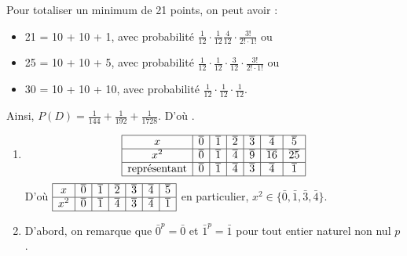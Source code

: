 \begin{description}
\begin{enumerate}
            Pour totaliser un minimum de 21 points, on peut avoir : 
            \begin{itemize}
               \item 21 = 10 + 10 + 1, avec probabilit\'e
                  $\frac{1}{12}\cdot\frac{1}{12}\frac{4}{12}\cdot\frac{3!}{2!\cdot1!}$ ou
               \item 25 = 10 + 10 + 5, avec probabilit\'e 
                  $\frac{1}{12}\cdot\frac{1}{12}\cdot\frac{3}{12}\cdot\frac{3!}{2!\cdot1!}$ ou
               \item 30 = 10 + 10 + 10, avec probabilit\'e 
                  $\frac{1}{12}\cdot\frac{1}{12}\cdot\frac{1}{12}$.
            \end{itemize}
            Ainsi, $P(D) = \frac{1}{144} + \frac{1}{192} + \frac{1}{1728}$.
            D'o\`u .
      \end{enumerate}
   \item[II. \textsc{Arithm\'etique}]
      \begin{enumerate}
         \item {}
            \[
               \begin{array}{|c|c|c|c|c|c|c|}
               \hline 
               x & \bar{0} & \bar{1} & \bar{2} & \bar{3} & \bar{4} & \bar{5} \\ 
               \hline 
               x^2 & \bar{0} & \bar{1} & \bar{4} & \bar{9} & \bar{16} & \bar{25} \\ 
               \hline 
               \text{repr\'esentant} & \bar{0} & \bar{1} & \bar{4} & \bar{3} & \bar{4} & \bar{1} \\ 
               \hline 
               \end{array} 
            \]
            D'o\`u 
            $\displaystyle{
               \begin{array}{|c|c|c|c|c|c|c|}
               \hline 
               x & \bar{0} & \bar{1} & \bar{2} & \bar{3} & \bar{4} & \bar{5} \\ 
               \hline 
               x^2 & \bar{0} & \bar{1} & \bar{4} & \bar{3} & \bar{4} & \bar{1} \\ 
               \hline 
               \end{array} 
            }$
            en particulier, $x^2 \in \{ \bar{0} , \bar{1} , \bar{3} , \bar{4} \}$.
         \item {}
            D'abord, on remarque que $\bar{0}^p = \bar{0}$ et $\bar{1}^p = \bar{1}$
            pour tout entier naturel non nul $p$.
            

\end{enumerate}
\end{description}
